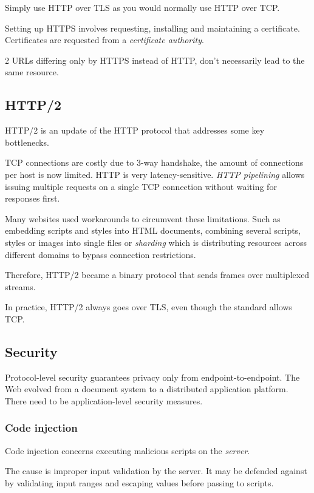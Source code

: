 \documentclass{report}
\begin{document}
Simply use HTTP over TLS
as you would normally use HTTP over TCP.

Setting up HTTPS involves requesting,
installing and maintaining a certificate.
Certificates are requested from a \emph{certificate authority}.

2 URLs differing only by HTTPS instead of HTTP,
don't necessarily lead to the same resource.

\subsection{HTTP/2}

HTTP/2 is an update of the HTTP protocol
that addresses some key bottlenecks.

TCP connections are costly due to 3-way handshake,
the amount of connections per host is now limited.
HTTP is very latency-sensitive.
\emph{HTTP pipelining} allows issuing multiple requests
on a single TCP connection without waiting for responses first.

Many websites used workarounds to circumvent these limitations.
Such as embedding scripts and styles into HTML documents,
combining several scripts, styles or images into single files
or \emph{sharding} which is distributing resources
across different domains to bypass connection restrictions.

Therefore, HTTP/2 became a binary protocol
that sends frames over multiplexed streams.

In practice, HTTP/2 always goes over TLS,
even though the standard allows TCP.

\subsection{Security}

Protocol-level security guarantees privacy
only from endpoint-to-endpoint.
The Web evolved from a document system
to a distributed application platform.
There need to be application-level security measures.

\subsubsection{Code injection}

Code injection concerns executing
malicious scripts on the \emph{server}.

The cause is improper input validation by the server.
It may be defended against by validating input ranges
and escaping values before passing to scripts.
\end{document}
